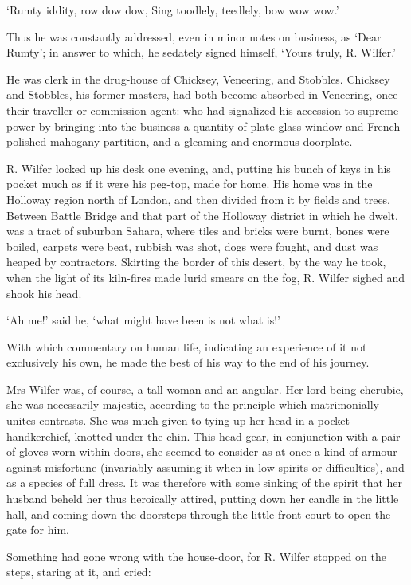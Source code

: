      ‘Rumty iddity, row dow dow,
     Sing toodlely, teedlely, bow wow wow.’

Thus he was constantly addressed, even in minor notes on business, as
‘Dear Rumty’; in answer to which, he sedately signed himself, ‘Yours
truly, R. Wilfer.’

He was clerk in the drug-house of Chicksey, Veneering, and Stobbles.
Chicksey and Stobbles, his former masters, had both become absorbed in
Veneering, once their traveller or commission agent: who had signalized
his accession to supreme power by bringing into the business a quantity
of plate-glass window and French-polished mahogany partition, and a
gleaming and enormous doorplate.

R. Wilfer locked up his desk one evening, and, putting his bunch of keys
in his pocket much as if it were his peg-top, made for home. His home
was in the Holloway region north of London, and then divided from it by
fields and trees. Between Battle Bridge and that part of the Holloway
district in which he dwelt, was a tract of suburban Sahara, where tiles
and bricks were burnt, bones were boiled, carpets were beat, rubbish was
shot, dogs were fought, and dust was heaped by contractors. Skirting
the border of this desert, by the way he took, when the light of its
kiln-fires made lurid smears on the fog, R. Wilfer sighed and shook his
head.

‘Ah me!’ said he, ‘what might have been is not what is!’

With which commentary on human life, indicating an experience of it
not exclusively his own, he made the best of his way to the end of his
journey.

Mrs Wilfer was, of course, a tall woman and an angular. Her lord being
cherubic, she was necessarily majestic, according to the principle which
matrimonially unites contrasts. She was much given to tying up her head
in a pocket-handkerchief, knotted under the chin. This head-gear, in
conjunction with a pair of gloves worn within doors, she seemed to
consider as at once a kind of armour against misfortune (invariably
assuming it when in low spirits or difficulties), and as a species of
full dress. It was therefore with some sinking of the spirit that her
husband beheld her thus heroically attired, putting down her candle in
the little hall, and coming down the doorsteps through the little front
court to open the gate for him.

Something had gone wrong with the house-door, for R. Wilfer stopped on
the steps, staring at it, and cried:

